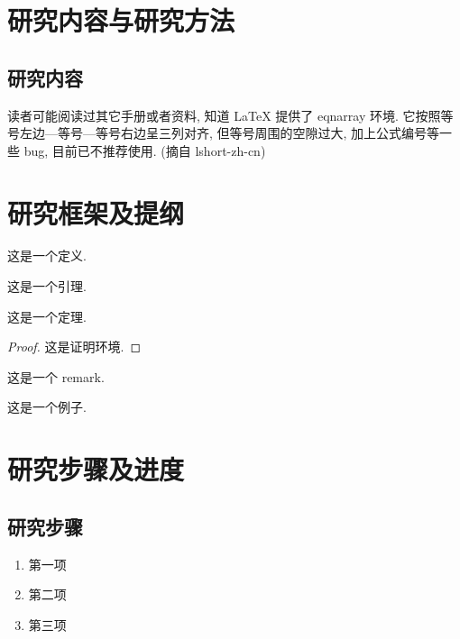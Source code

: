 \documentclass{phdproposal}
\begin{document}
\section{研究内容与研究方法}

\subsection{研究内容}

读者可能阅读过其它手册或者资料, 知道 LaTeX 提供了 eqnarray 环境. 它按照等号左边—等号—等号右边呈三列对齐, 但等号周围的空隙过大, 加上公式编号等一些 bug, 目前已不推荐使用. (摘自 lshort-zh-cn)



\section{研究框架及提纲}

\begin{definition}
这是一个定义.
\end{definition}

\begin{lemma}[Lemma] \label{lemma1}
这是一个引理.
\end{lemma}

\begin{theorem}[Theorem]
这是一个定理.
\end{theorem}
\begin{proof}
这是证明环境.
\end{proof}

\begin{remark}\label{remark1}
这是一个 remark.
\end{remark}

\begin{example}
这是一个例子.
\end{example}


\section{研究步骤及进度}

\subsection{研究步骤}

\begin{enumerate}[label=(\arabic*)]
	\item 第一项
	\item 第二项
    \item 第三项
\end{enumerate}
\end{document}
